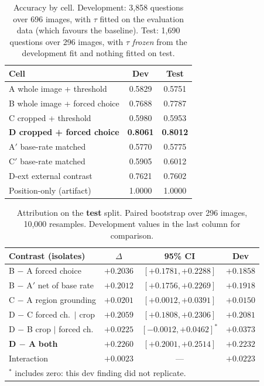 \documentclass[conference]{IEEEtran}
\begin{document}
\begin{table}[t]
\caption{Accuracy by cell. Development: 3{,}858 questions over 696 images, with
$\tau$ fitted on the evaluation data (which favours the baseline). Test:
1{,}690 questions over 296 images, with $\tau$ \emph{frozen} from the
development fit and nothing fitted on test.}
\label{tab:cells}
\centering
\begin{tabular}{lcc}
\toprule
\textbf{Cell} & \textbf{Dev} & \textbf{Test} \\
\midrule
A \;\; whole image + threshold & 0.5829 & 0.5751 \\
B \;\; whole image + forced choice & 0.7688 & 0.7787 \\
C \;\; cropped + threshold & 0.5980 & 0.5953 \\
\textbf{D \;\; cropped + forced choice} & \textbf{0.8061} & \textbf{0.8012} \\
\midrule
A$'$ base-rate matched & 0.5770 & 0.5775 \\
C$'$ base-rate matched & 0.5905 & 0.6012 \\
D-ext external contrast & 0.7621 & 0.7602 \\
Position-only (artifact) & 1.0000 & 1.0000 \\
\bottomrule
\end{tabular}
\end{table}

\begin{table}[t]
\caption{Attribution on the \textbf{test} split. Paired bootstrap over 296
images, 10{,}000 resamples. Development values in the last column for
comparison.}
\label{tab:attrib}
\centering
\small
\begin{tabular}{lccc}
\toprule
\textbf{Contrast (isolates)} & $\Delta$ & \textbf{95\% CI} & \textbf{Dev} \\
\midrule
B $-$ A \; forced choice & $+0.2036$ & $[+0.1781, +0.2288]$ & $+0.1858$ \\
B $-$ A$'$ \; net of base rate & $+0.2012$ & $[+0.1756, +0.2269]$ & $+0.1918$ \\
C $-$ A \; region grounding & $+0.0201$ & $[+0.0012, +0.0391]$ & $+0.0150$ \\
D $-$ C \; forced ch.\ $\mid$ crop & $+0.2059$ & $[+0.1808, +0.2306]$ & $+0.2081$ \\
D $-$ B \; crop $\mid$ forced ch. & $+0.0225$ & $[-0.0012, +0.0462]^{\ast}$ & $+0.0373$ \\
\midrule
\textbf{D $-$ A} \; \textbf{both} & $\mathbf{+0.2260}$ & $\mathbf{[+0.2001, +0.2514]}$ & $+0.2232$ \\
\midrule
Interaction & $+0.0023$ & --- & $+0.0223$ \\
\bottomrule
\multicolumn{4}{l}{\footnotesize $^{\ast}$ includes zero: this dev finding did not replicate.}
\end{tabular}
\end{table}
\end{document}
